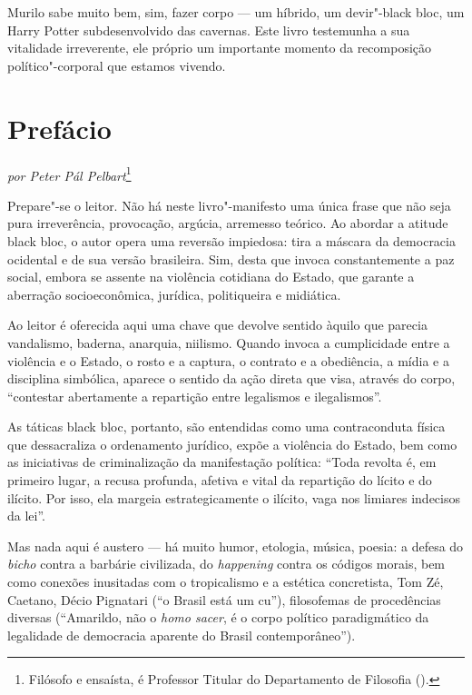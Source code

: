 Murilo sabe muito bem, sim, fazer corpo --- um híbrido, um devir"-black
bloc, um Harry Potter subdesenvolvido das cavernas. Este livro
testemunha a sua vitalidade irreverente, ele próprio um importante
momento da recomposição político"-corporal que estamos vivendo.



\chapter*{Prefácio}

\begin{flushright}
\emph{por Peter Pál Pelbart}\footnote{Filósofo e ensaísta, é
Professor Titular do Departamento de Filosofia ().}
\end{flushright}

Prepare"-se o leitor. Não há neste livro"-manifesto uma única frase que
não seja pura irreverência, provocação, argúcia, arremesso teórico. Ao
abordar a atitude black bloc, o autor opera uma reversão
impiedosa: tira a máscara da democracia ocidental e de sua versão
brasileira. Sim, desta que invoca constantemente a paz social, embora se
assente na violência cotidiana do Estado, que garante a aberração
socioeconômica, jurídica, politiqueira e midiática.

Ao leitor é oferecida aqui uma chave que devolve sentido àquilo que
parecia vandalismo, baderna, anarquia, niilismo. Quando invoca a
cumplicidade entre a violência e o Estado, o rosto e a captura, o
contrato e a obediência, a mídia e a disciplina simbólica, aparece o
sentido da ação direta que visa, através do corpo, ``contestar
abertamente a repartição entre legalismos e ilegalismos''.

As táticas black bloc, portanto, são entendidas como uma
contraconduta física que dessacraliza o ordenamento jurídico, expõe a
violência do Estado, bem como as iniciativas de criminalização da
manifestação política: ``Toda revolta é, em primeiro lugar, a recusa
profunda, afetiva e vital da repartição do lícito e do ilícito. Por
isso, ela margeia estrategicamente o ilícito, vaga nos limiares
indecisos da lei''.

Mas nada aqui é austero --- há muito humor, etologia, música, poesia: a
defesa do \emph{bicho} contra a barbárie civilizada, do \emph{happening}
contra os códigos morais, bem como conexões inusitadas com o
tropicalismo e a estética concretista, Tom Zé, Caetano, Décio Pignatari
(``o Brasil está um cu''), filosofemas de procedências diversas
(``Amarildo, não o \emph{homo sacer}, é o corpo político paradigmático
da legalidade de democracia aparente do Brasil contemporâneo'').

